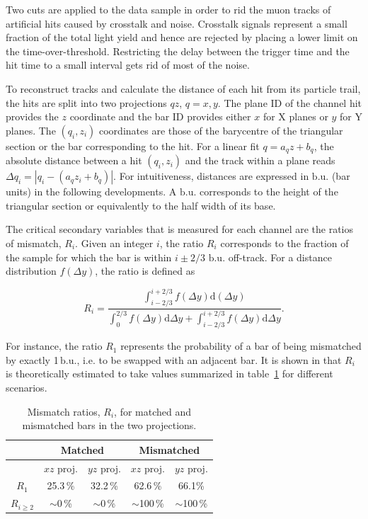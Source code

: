 \documentclass[a4paper,11pt]{article}
\begin{document}
Two cuts are applied to the data sample in order to rid the muon tracks of artificial hits caused by crosstalk and noise. Crosstalk signals represent a small fraction of the total light yield and hence are rejected by placing a lower limit on the time-over-threshold. Restricting the delay between the trigger time and the hit time to a small interval gets rid of most of the noise.

To reconstruct tracks and calculate the distance of each hit from its particle trail, the hits are split into two projections $qz$, $q=x,y$. The plane ID of the channel hit provides the $z$ coordinate and the bar ID provides either $x$ for X planes or $y$ for Y planes. The $(q_i,z_i)$ coordinates are those of the barycentre of the triangular section or the bar corresponding to the hit. For a linear fit $q=a_qz+b_q$, the absolute distance between a hit $(q_i,z_i)$ and the track within a plane reads $\Delta q_i=|q_i-(a_qz_i+b_q)|$. For intuitiveness, distances are expressed in $\mathrm{b.u.}$ (bar units) in the following developments. A $\mathrm{b.u.}$ corresponds to the height of the triangular section or equivalently to the half width of its base.

The critical secondary variables that is measured for each channel are the ratios of mismatch, $R_i$. Given an integer $i$, the ratio $R_i$ corresponds to the fraction of the sample for which the bar is within $i\pm2/3$ $\mathrm{b.u.}$ off-track. For a distance distribution $f(\Delta y)$, the ratio is defined as

\begin{equation}
R_i=\frac{\int_{i-2/3}^{i+2/3}f(\Delta y)\mathrm{d}(\Delta y)}{\int_{0}^{2/3}f(\Delta y)\mathrm{d}\Delta y+\int_{i-2/3}^{i+2/3}f(\Delta y)\mathrm{d}\Delta y}.
\end{equation}

For instance, the ratio $R_1$ represents the probability of a bar of being mismatched by exactly 1\,$\mathrm{b.u.}$, i.e. to be swapped with an adjacent bar. It is shown in \cite{Francois} that $R_i$ is theoretically estimated to take values summarized in table~\ref{tab:mismatch_ratio} for different scenarios.

\begin{table}[!h]
 \centering
 \begin{tabular}{c|c|c|c|c}
  & \multicolumn{2}{c|}{Matched} & \multicolumn{2}{c}{Mismatched}  \\
  \hline
  & $xz$ proj. & $yz$ proj. & $xz$ proj. & $yz$ proj. \\
  \hline
  $R_1$ & 25.3\,\% & 32.2\,\% & 62.6\,\% & 66.1\%  \\
  $R_{i\geq2}$ & $\sim$0\,\% & $\sim$0\,\% & $\sim$100\,\% & $\sim$100\,\%
 \end{tabular}
 \caption{Mismatch ratios, $R_i$, for matched and mismatched bars in the two projections.}
 \label{tab:mismatch_ratio}
\end{table}
\end{document}

